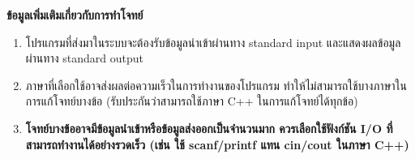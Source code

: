 \documentclass[11pt,a4paper]{article}
\begin{document}
{\Large \textbf{ข้อมูลเพิ่มเติมเกี่ยวกับการทำโจทย์}}

\begin{enumerate}
  \item โปรแกรมที่ส่งมาในระบบจะต้องรับข้อมูลนำเข้าผ่านทาง standard input และแสดงผลข้อมูลผ่านทาง standard output
  \item ภาษาที่เลือกใช้อาจส่งผลต่อความเร็วในการทำงานของโปรแกรม ทำให้ไม่สามารถใช้บางภาษาใน
  การแก้โจทย์บางข้อ (รับประกันว่าสามารถใช้ภาษา C++ ในการแก้โจทย์ได้ทุกข้อ)
  \item \textbf{โจทย์บางข้ออาจมีข้อมูลนำเข้าหรือข้อมูลส่งออกเป็นจำนวนมาก ควรเลือกใช้ฟังก์ชัน I/O ที่
  สามารถทำงานได้อย่างรวดเร็ว (เช่น ใช้ scanf/printf แทน cin/cout ในภาษา C++)}
\end{enumerate}

\pagebreak
\end{document}

